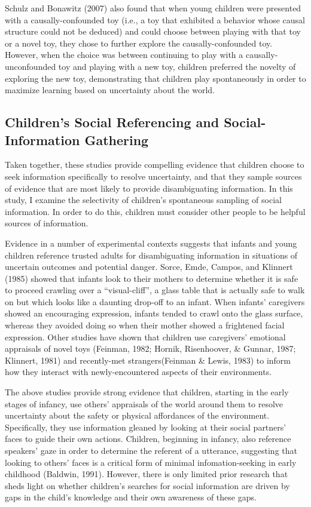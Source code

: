 \documentclass[,man,floatsintext]{apa6}
\begin{document}
Schulz and Bonawitz (2007) also found that when young children were presented with a causally-confounded toy (i.e., a toy that exhibited a behavior whose causal structure could not be deduced) and could choose between playing with that toy or a novel toy, they chose to further explore the causally-confounded toy. However, when the choice was between continuing to play with a causally-unconfounded toy and playing with a new toy, children preferred the novelty of exploring the new toy, demonstrating that children play spontaneously in order to maximize learning based on uncertainty about the world.

\hypertarget{childrens-social-referencing-and-social-information-gathering}{%
\subsection{Children's Social Referencing and Social-Information Gathering}\label{childrens-social-referencing-and-social-information-gathering}}

Taken together, these studies provide compelling evidence that children choose to seek information specifically to resolve uncertainty, and that they sample sources of evidence that are most likely to provide disambiguating information. In this study, I examine the selectivity of children's spontaneous sampling of social information. In order to do this, children must consider other people to be helpful sources of information.

Evidence in a number of experimental contexts suggests that infants and young children reference trusted adults for disambiguating information in situations of uncertain outcomes and potential danger. Sorce, Emde, Campos, and Klinnert (1985) showed that infants look to their mothers to determine whether it is safe to proceed crawling over a \enquote{visual-cliff}, a glass table that is actually safe to walk on but which looks like a daunting drop-off to an infant. When infants' caregivers showed an encouraging expression, infants tended to crawl onto the glass surface, whereas they avoided doing so when their mother showed a frightened facial expression. Other studies have shown that children use caregivers' emotional appraisals of novel toys (Feinman, 1982; Hornik, Risenhoover, \& Gunnar, 1987; Klinnert, 1981) and recently-met strangers(Feinman \& Lewis, 1983) to inform how they interact with newly-encountered aspects of their environments.

The above studies provide strong evidence that children, starting in the early stages of infancy, use others' appraisals of the world around them to resolve uncertainty about the safety or physical affordances of the environment. Specifically, they use information gleaned by looking at their social partners' faces to guide their own actions. Children, beginning in infancy, also reference speakers' gaze in order to determine the referent of a utterance, suggesting that looking to others' faces is a critical form of minimal infomation-seeking in early childhood (Baldwin, 1991). However, there is only limited prior research that sheds light on whether children's searches for social information are driven by gaps in the child's knowledge and their own awareness of these gaps.
\end{document}
